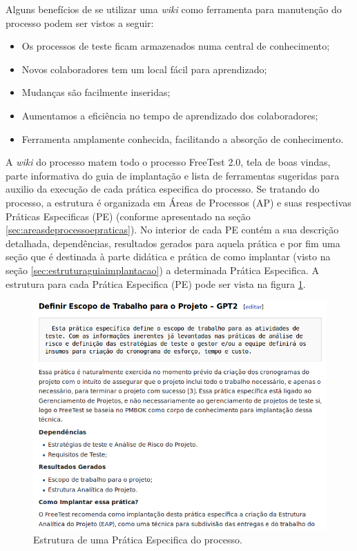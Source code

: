 Alguns benefícios de se utilizar uma \textit{wiki} como ferramenta para manutenção do processo podem ser vistos a seguir:

\begin{itemize}
	\item Os processos de teste ficam armazenados numa central de conhecimento;
    \item Novos colaboradores tem um local fácil para aprendizado;
    \item Mudanças são facilmente inseridas;
    \item Aumentamos a eficiência no tempo de aprendizado dos colaboradores;
    \item Ferramenta amplamente conhecida, facilitando a absorção de conhecimento.
\end{itemize}

A \textit{wiki} do processo matem todo o processo FreeTest 2.0, tela de boas vindas, parte informativa do guia de implantação e lista de ferramentas sugeridas para auxilio da execução de cada prática especifica do processo. Se tratando do processo, a estrutura é organizada em Áreas de Processos (AP) e suas respectivas Práticas Especificas (PE) (conforme apresentado na seção \ref{sec:areasdeprocessoepraticas}). No interior de cada PE contém a sua descrição detalhada, dependências, resultados gerados para aquela prática e por fim uma seção que é destinada à parte didática e prática de como implantar (visto na seção \ref{sec:estruturaguiaimplantacao}) a determinada Prática Especifica. A estrutura para cada Prática Especifica (PE) pode ser vista na figura \ref{fig:fig64}.

\begin{figure}[H]
\centering
\includegraphics[width=.90\textwidth]{fig/figura64.png}
\caption{Estrutura de uma Prática Especifica do processo.}
\label{fig:fig64}
\end{figure}

